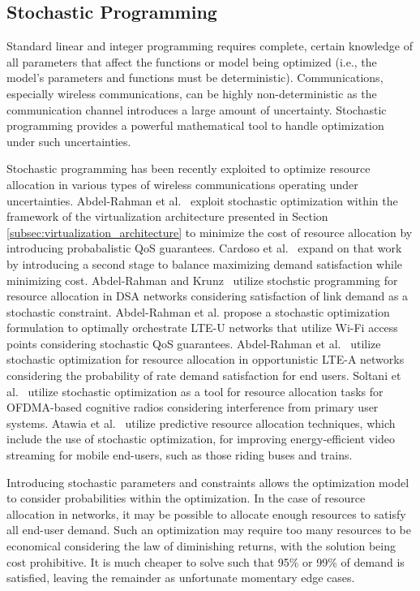 \documentclass[12pt,dvipsnames]{report}
\begin{document}
\subsection{Stochastic Programming}	\label{subsec:optreview_stoch}

Standard linear and integer programming requires complete, certain knowledge of all parameters that affect the functions or model being optimized (i.e., the model's parameters and functions must be deterministic).  Communications, especially wireless communications, can be highly non-deterministic as the communication channel introduces a large amount of uncertainty.  Stochastic programming provides a powerful mathematical tool to handle optimization under such uncertainties.

Stochastic programming has been recently exploited to optimize resource allocation in various types of wireless communications operating under uncertainties.  Abdel-Rahman et al.~\cite{MJ_CCNC_16} exploit stochastic optimization within the framework of the virtualization architecture presented in Section \ref{subsec:virtualization_architecture} to minimize the cost of resource allocation by introducing probabalistic QoS guarantees.  Cardoso et al.~\cite{MJ_MECOMM_17} expand on that work by introducing a second stage to balance maximizing demand satisfaction while minimizing cost.  Abdel-Rahman and Krunz~\cite{MJ_TW_13} utilize stochstic programming for resource allocation in DSA networks considering satisfaction of link demand as a stochastic constraint.  Abdel-Rahman et al.\cite{MJ_WCNC_16} propose a stochastic optimization formulation to optimally orchestrate LTE-U networks that utilize Wi-Fi access points considering stochastic QoS guarantees.  Abdel-Rahman et al.~\cite{MJ_DySPAN_15} utilize stochastic optimization for resource allocation in opportunistic LTE-A networks considering the probability of rate demand satisfaction for end users.  Soltani et al.~\cite{CC_OFDMA} utilize stochastic optimization as a tool for resource allocation tasks for OFDMA-based cognitive radios considering interference from primary user systems.  Atawia et al.~\cite{CC_video} utilize predictive resource allocation techniques, which include the use of stochastic optimization, for improving energy-efficient video streaming for mobile end-users, such as those riding buses and trains.

Introducing stochastic parameters and constraints allows the optimization model to consider probabilities within the optimization.  In the case of resource allocation in networks, it may be possible to allocate enough resources to satisfy all end-user demand.  Such an optimization may require too many resources to be economical considering the law of diminishing returns, with the solution being cost prohibitive.  It is much cheaper to solve such that 95\% or 99\% of demand is satisfied, leaving the remainder as unfortunate momentary edge cases.
\end{document}
